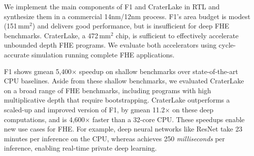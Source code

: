 We implement the main components of F1 and CraterLake in RTL and synthesize
them in a commercial 14nm/12nm process. F1's area budget is modest
(151\,mm$^2$) and delivers good performance, but is insufficient for deep FHE
benchmarks. CraterLake, a 472\,mm$^2$ chip, is sufficient to effectively
accelerate unbounded depth FHE programs. We evaluate both accelerators using
cycle-accurate simulation running complete FHE applications.

F1 shows gmean 5,400$\times$ speedup on shallow benchmarks over
state-of-the-art CPU baselines. Aside from these shallow benchmarks, we
evaluated CraterLake on a broad range of FHE benchmarks, including programs
with high multiplicative depth that require bootstrapping. CraterLake
outperforms a scaled-up and improved version of F1, by gmean 11.2$\times$ on
these deep computations, and is 4,600$\times$ faster than a 32-core CPU. These
speedups enable new use cases for FHE. For example, deep neural networks like
ResNet take 23 minutes per inference on the CPU, whereas \name achieves 250
\emph{milliseconds} per inference, enabling real-time private deep learning.


